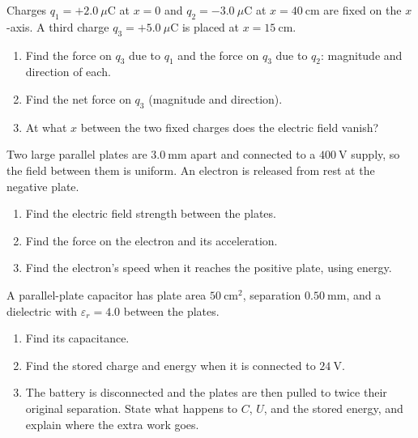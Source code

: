
\begin{exercise}\label{ex:em-1}
Charges $q_1 = +2.0\ \mu\mathrm{C}$ at $x = 0$ and $q_2 = -3.0\ \mu\mathrm{C}$ at $x = 40\ \mathrm{cm}$ are fixed on the $x$-axis. A third charge $q_3 = +5.0\ \mu\mathrm{C}$ is placed at $x = 15\ \mathrm{cm}$.
\begin{enumerate}[label=(\alph*)]
  \item Find the force on $q_3$ due to $q_1$ and the force on $q_3$ due to $q_2$: magnitude and direction of each.
  \item Find the net force on $q_3$ (magnitude and direction).
  \item At what $x$ between the two fixed charges does the electric field vanish?
\end{enumerate}
\end{exercise}

\begin{exercise}\label{ex:em-2}
Two large parallel plates are $3.0\ \mathrm{mm}$ apart and connected to a $400\ \mathrm{V}$ supply, so the field between them is uniform. An electron is released from rest at the negative plate.
\begin{enumerate}[label=(\alph*)]
  \item Find the electric field strength between the plates.
  \item Find the force on the electron and its acceleration.
  \item Find the electron's speed when it reaches the positive plate, using energy.
\end{enumerate}
\end{exercise}

\begin{exercise}\label{ex:em-3}
A parallel-plate capacitor has plate area $50\ \mathrm{cm^2}$, separation $0.50\ \mathrm{mm}$, and a dielectric with $\varepsilon_r = 4.0$ between the plates.
\begin{enumerate}[label=(\alph*)]
  \item Find its capacitance.
  \item Find the stored charge and energy when it is connected to $24\ \mathrm{V}$.
  \item The battery is disconnected and the plates are then pulled to twice their original separation. State what happens to $C$, $U$, and the stored energy, and explain where the extra work goes.
\end{enumerate}
\end{exercise}

